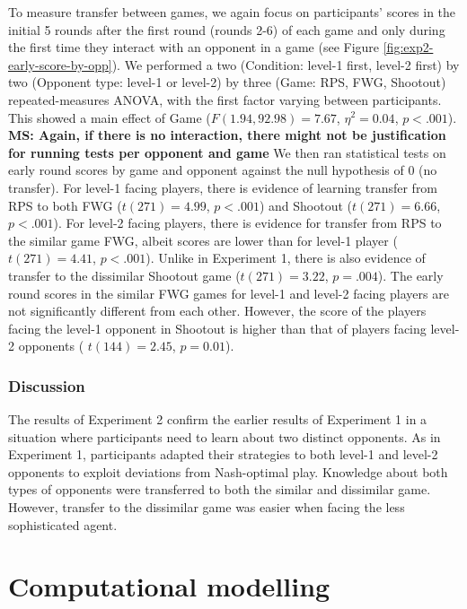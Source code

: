 \documentclass[
  english,
  man,floatsintext]{apa6}
\begin{document}
To measure transfer between games, we again focus on participants' scores in the initial 5 rounds after the first round (rounds 2-6) of each game and only during the first time they interact with an opponent in a game (see Figure \ref{fig:exp2-early-score-by-opp}). We performed a two (Condition: level-1 first, level-2 first) by two (Opponent type: level-1 or level-2) by three (Game: RPS, FWG, Shootout) repeated-measures ANOVA, with the first factor varying between participants. This showed a main effect of Game (\(F(1.94,92.98) = 7.67\), \(\eta^{2} = 0.04\), \(p < .001\)). \textbf{MS: Again, if there is no interaction, there might not be justification for running tests per opponent and game }
We then ran statistical tests on early round scores by game and opponent against the null hypothesis of 0 (no transfer). For level-1 facing players, there is evidence of learning transfer from RPS to both FWG (\(t(271) = 4.99\), \(p < .001\)) and Shootout (\(t(271) = 6.66\), \(p < .001\)). For level-2 facing players, there is evidence for transfer from RPS to the similar game FWG, albeit scores are lower than for level-1 player (\(t(271) = 4.41\), \(p < .001\)). Unlike in Experiment 1, there is also evidence of transfer to the dissimilar Shootout game (\(t(271) = 3.22\), \(p = .004\)). The early round scores in the similar FWG games for level-1 and level-2 facing players are not significantly different from each other. However, the score of the players facing the level-1 opponent in Shootout is higher than that of players facing level-2 opponents ( \(t(144) = 2.45\), \(p = 0.01\)).

\hypertarget{discussion-1}{%
\subsubsection{Discussion}\label{discussion-1}}

The results of Experiment 2 confirm the earlier results of Experiment 1 in a situation where participants need to learn about two distinct opponents. As in Experiment 1, participants adapted their strategies to both level-1 and level-2 opponents to exploit deviations from Nash-optimal play. Knowledge about both types of opponents were transferred to both the similar and dissimilar game. However, transfer to the dissimilar game was easier when facing the less sophisticated agent.

\hypertarget{computational-modelling}{%
\section{Computational modelling}\label{computational-modelling}}
\end{document}

